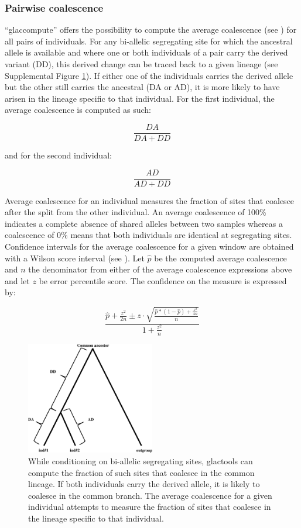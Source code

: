 \documentclass[a4paper]{article}
\begin{document}
\subsubsection{Pairwise coalescence}

``glaccompute'' offers the possibility to compute the average coalescence (see \cite{prufer2010computational}) for all pairs of individuals. For any bi-allelic segregating site for which the ancestral allele is available and where one or both individuals of a pair carry the derived variant (DD), this derived change can be traced back to a given lineage (see Supplemental Figure \ref{fig:div}). If either one of the individuals carries the derived allele but the other still carries the ancestral (DA or AD), it is more likely to have arisen in the lineage specific to that individual. For the first individual, the average coalescence is computed as such: 

\[
\frac { DA} { DA+DD }
\]

\noindent and for the second individual:

\[
\frac {AD} { AD+DD }
\]

Average coalescence for an individual measures the fraction of sites that coalesce after the split from the other individual. An average coalescence of 100\% indicates a complete absence of shared alleles between two samples whereas a coalescence of 0\% means that both individuals are identical at segregating sites. Confidence intervals for the average coalescence for a given window are obtained  with a Wilson score interval (see \cite{wilson1927probable}). Let $\hat{p}$ be the computed average coalescence and $n$ the denominator from either of the average coalescence expressions above and let $z$ be error percentile score. The confidence on the measure is expressed by:


\[
\frac{  \hat{p} + \frac {z^2} {2n} \pm z \cdot \sqrt {  \frac {\hat{p}*(1-\hat{p})+ \frac {z^2} {4n} } {n} }} {1+ \frac {z^2} {n} }
\]

\begin{figure}[!tpb]%
  \centerline{\includegraphics[width=0.5\textwidth,natwidth=510,natheight=542]{coasnowhite.eps}}
\caption{
While conditioning on bi-allelic segregating sites, glactools can compute the fraction of such sites that coalesce in the common lineage. If both individuals carry the derived allele, it is likely to coalesce in the common branch. The average coalescence for a given individual attempts to measure the fraction of sites that coalesce in the lineage specific to that individual.}
\label{fig:div}
\end{figure}
\end{document}
